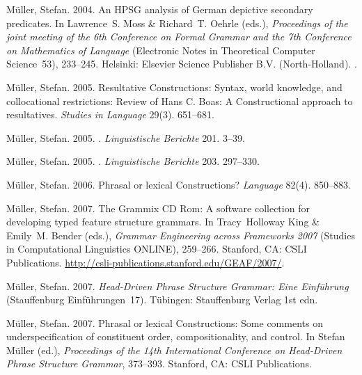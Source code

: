 \begin{thebibliography}{1420}
M{\"u}ller, Stefan. 2004{}.
\newblock An {HPSG} analysis of {German} depictive secondary predicates.
\newblock In Lawrence~S. Moss \& Richard~T. Oehrle (eds.), \emph{Proceedings of
  the joint meeting of the {6th Conference on Formal Grammar and the 7th
  Conference on Mathematics of Language}} (Electronic Notes in Theoretical
  Computer Science~53), 233--245. Helsinki: Elsevier Science Publisher B.V.
  (North-Holland).
\newblock {}.

M{\"u}ller, Stefan. 2005{}.
\newblock Resultative {Constructions}: {Syntax}, world knowledge, and
  collocational restrictions: {Review} of {Hans C. Boas}: {A} {Constructional}
  approach to resultatives.
\newblock \emph{Studies in Language} 29(3). 651--681.

M{\"u}ller, Stefan. 2005{}.
.
\newblock \emph{Linguistische Berichte} 201. 3--39.

M{\"u}ller, Stefan. 2005{}.
.
\newblock \emph{Linguistische Berichte} 203. 297--330.

M{\"u}ller, Stefan. 2006.
\newblock Phrasal or lexical {Constructions}?
\newblock \emph{Language} 82(4). 850--883.

M{\"u}ller, Stefan. 2007{}.
\newblock The {Grammix CD Rom}: {A} software collection for developing typed
  feature structure grammars.
\newblock In Tracy~Holloway King \& Emily~M. Bender (eds.), \emph{{Grammar
  Engineering across Frameworks 2007}}  (Studies in Computational Linguistics
  ONLINE), 259--266. Stanford, CA: CSLI Publications.
\newblock \urlprefix\url{http://csli-publications.stanford.edu/GEAF/2007/}.

M{\"u}ller, Stefan. 2007{}.
\newblock \emph{{Head-Driven Phrase Structure Grammar: Eine Einf{\"u}hrung}}
  (Stauffenburg Einf{\"u}hrungen~17).
\newblock T{\"u}bingen: Stauffenburg Verlag 1st edn.

M{\"u}ller, Stefan. 2007{}.
\newblock Phrasal or lexical {Constructions}: {Some} comments on
  underspecification of constituent order, compositionality, and control.
\newblock In Stefan M{\"u}ller (ed.), \emph{Proceedings of the {14th
  International Conference on Head-Driven Phrase Structure Grammar}}, 373--393.
  Stanford, CA: CSLI Publications.


\end{thebibliography}
